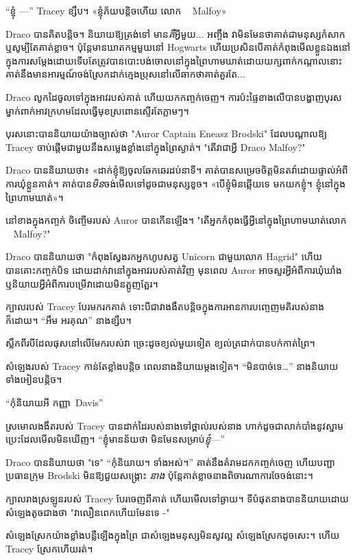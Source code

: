 “ខ្ញុំ —” Tracey ខ្សឹប។ «ខ្ញុំ​ភ័យ​បន្តិច​ហើយ លោក ~ Malfoy»

Draco បានគិតបន្តិច។ និយាយឱ្យត្រង់ទៅ មាន\emph{គឺ}អ្វីមួយ... អញ្ចឹង វាមិនមែនថាគាត់ជាមនុស្សកំសាក ឬសូម្បីតែគាត់ខ្លាច។ ប៉ុន្តែមានឃាតកម្មមួយនៅ Hogwarts ហើយប្រសិនបើគាត់កំពុងមើលខ្លួនឯងនៅក្នុងការសម្តែងដោយទើបតែត្រូវបានបោះបង់ចោលនៅក្នុងព្រៃហាមឃាត់ដោយយក្សពាក់កណ្តាលនោះ គាត់នឹងមានអារម្មណ៍ចង់ស្រែកដាក់ក្មេងប្រុសនៅលើឆាកថាគាត់គួរតែ...

Draco លូកដៃចូលទៅក្នុងអាវរបស់គាត់ ហើយយកកញ្ចក់ចេញ។ ការ​ប៉ះ​ផ្ទៃ​ខាង​លើ​បាន​បង្ហាញ​បុរស​ម្នាក់​ពាក់​អាវ​ក្រហម​ដែល​ធ្វើ​មុខ​ស្រពោន​ស្ទើរ​តែ​ភ្លាមៗ។

បុរសនោះបាននិយាយយ៉ាងច្បាស់ថា "Auror Captain Eneasz Brodski" ដែលបណ្តាលឱ្យ Tracey ចាប់ផ្តើមជាមួយនឹងសម្លេងខ្លាំងនៅក្នុងព្រៃស្ងាត់។ "តើវាជាអ្វី Draco Malfoy?"

Draco បាន​និយាយ​ថា​៖ «​ដាក់​ខ្ញុំ​ឱ្យ​ចូល​ឆែក​ឆេរ​ដប់​នាទី​។ គាត់​បាន​សម្រេច​ចិត្ត​មិន​តវ៉ា​ដោយ​ផ្ទាល់​អំពី​ការ​ឃុំ​ខ្លួន​គាត់។ គាត់​បាន​\emph{មិន​} ចង់​មើល​ទៅ​ដូច​ជា​មនុស្ស​ខូច។ «បើ​ខ្ញុំ​មិន​ឆ្លើយ​ទេ មក​យក​ខ្ញុំ។ ខ្ញុំ​នៅ​ក្នុង​ព្រៃ​ហាមឃាត់»។

នៅខាងក្នុងកញ្ចក់ ចិញ្ចើមរបស់ Auror បានកើនឡើង។ "តើអ្នកកំពុងធ្វើអ្វីនៅក្នុងព្រៃហាមឃាត់លោក ~ Malfoy?"

Draco បាននិយាយថា "កំពុងស្វែងរកអ្នកហូបសត្វ Unicorn ជាមួយលោក Hagrid" ហើយបានគោះកញ្ចក់បិទ ដោយដាក់វានៅក្នុងអាវរបស់គាត់វិញ មុនពេល Auror អាចសួរអ្វីអំពីការឃុំឃាំង ឬនិយាយអ្វីអំពីការបម្រើវាដោយមិនត្អូញត្អែរ។

ក្បាលរបស់ Tracey បែរមករកគាត់ ទោះបីជាវាងងឹតបន្តិចក្នុងការអានការបញ្ចេញមតិរបស់នាងក៏ដោយ។ “អឹម អរគុណ” នាងខ្សឹប។

ស្លឹកពីរបីដែលផុសនៅលើមែករបស់វា ច្រេះដូចខ្យល់មួយទៀត ខ្យល់ត្រជាក់បានបក់កាត់ព្រៃ។

សំឡេង​របស់ Tracey កាន់តែ​ខ្លាំង​បន្តិច ពេល​នាង​និយាយ​ម្ដងទៀត។ “មិនបាច់ទេ…” នាងនិយាយទាំងអៀនបន្តិច។

“កុំនិយាយអី កញ្ញា~Davis”

ស្រមោលងងឹតរបស់ Tracey បានដាក់ដៃរបស់នាងទៅថ្ពាល់របស់នាង ហាក់ដូចជាលាក់បាំងនូវស្នាមប្រេះដែលមើលមិនឃើញ។ “ខ្ញុំមានន័យថា មិនមែនសម្រាប់\emph{ខ្ញុំ}—”

Draco បាននិយាយថា "ទេ" “កុំនិយាយ។ ទាំងអស់។” គាត់​នឹង​គំរាម​ដក​កញ្ចក់​ចេញ ហើយ​បញ្ជា​ប្រធាន​ក្រុម Brodski មិន​ឱ្យ​ជួយ​សង្គ្រោះ \emph{នាង} ប៉ុន្តែ​គាត់​ខ្លាច​នាង​ពិចារណា​ការ​ចែចង់​នោះ។

ក្បាល​រាង​ស្រឡូន​របស់ Tracey បែរ​ចេញ​ពី​គាត់ ហើយ​មើល​ទៅ​ឆ្ងាយ។ ទីបំផុតនាងបាននិយាយដោយសំឡេងតូចជាងថា "វាលឿនពេកហើយមែនទេ -"

សំឡេង​ស្រែក​យ៉ាង​ខ្លាំង​បន្លឺ​ឡើង​ក្នុង​ព្រៃ ជា​សំឡេង​មនុស្ស​មិន​សូវ​ល្អ សំឡេង​ស្រែក​ដូច​សេះ។ ហើយ Tracey ស្រែកហើយរត់។

